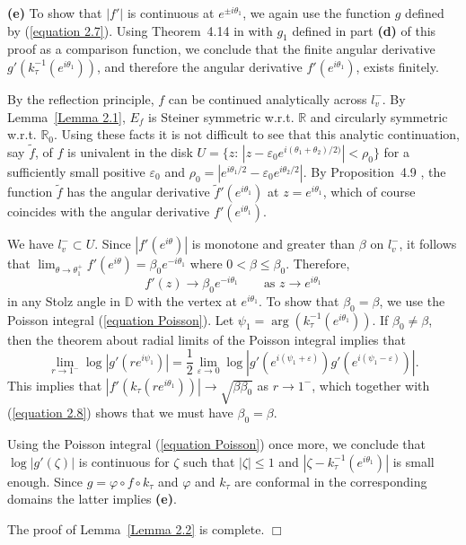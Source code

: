 \documentclass[mn,a4paper,fleqn]{w-art}
\newcommand{\be}{\begin{equation}}
\newcommand{\ee}{\end{equation}}
\begin{document}
{\textbf{(e)} To show that $|f'|$ is continuous at $e^{\pm
i\theta_1}$, we again use the function $g$ defined by
(\ref{equation 2.7}). Using Theorem~4.14 in \cite{P} with $g_1$
defined in part \textbf{(d)} of this proof as a comparison
function, we conclude that the finite angular derivative
$g'(k_\tau^{-1}(e^{i\theta_1}))$, and therefore the angular
derivative $f'(e^{i\theta_1})$, exists finitely.

By the reflection principle, $f$ can be continued analytically
across $l_v^-$. By Lemma~\ref{Lemma 2.1}, $E_f$ is Steiner
symmetric w.r.t. $\mathbb{R}$ and circularly symmetric w.r.t.
$\mathbb{R}_0$. Using these facts it is not difficult to see that
this analytic continuation, say $\tilde f$, of $f$ is univalent in
the disk
$U=\{z:\,|z-\varepsilon_0e^{i(\theta_1+\theta_2)/2)}|<\rho_0\}$
for a sufficiently small positive $\varepsilon_0$ and
$\rho_0=|e^{i\theta_1/2}-\varepsilon_0e^{i\theta_2/2}|$. By
Proposition~4.9 \cite{P}, the function $\tilde f$ has the angular
derivative ${\tilde f}'(e^{i\theta_1})$ at $z=e^{i\theta_1}$,
which of course coincides with the angular derivative
$f'(e^{i\theta_1})$.

We have $l_v^-\subset U$. Since $|f'(e^{i\theta})|$ is monotone
and greater than $\beta$ on $l_v^-$, it follows that
$\lim_{\theta\to \theta_1^+}
f'(e^{i\theta})=\beta_0e^{-i\theta_1}$ where
$0 < \beta \le \beta_0$. Therefore,  %
\be  \label{equation 2.8} %
f'(z)\to \beta_0e^{-i\theta_1} \quad \quad {\mbox{as \ \ $z\to
e^{i\theta_1}$}}  %
\ee  %
in any Stolz angle in $\mathbb{D}$ with the vertex at
$e^{i\theta_1}$. To show that $\beta_0=\beta$, we use the Poisson
integral (\ref{equation Poisson}). Let
$\psi_1=\arg(k_\tau^{-1}(e^{i\theta_1}))$. If $\beta_0\not=\beta$,
then the theorem about radial limits of the Poisson integral
implies
that %
$$  %
\lim_{r\to 1^-}\log|g'(re^{i\psi_1})|=\frac12\lim_{\varepsilon \to
0}
\log|g'(e^{i(\psi_1+\varepsilon)})g'(e^{i(\psi_1-\varepsilon)})|. %
$$  %
This implies that $|f'(k_\tau(re^{i\theta_1}))|\to
\sqrt{\beta\beta_0}$ as $r\to 1^-$, which together with
(\ref{equation 2.8}) shows that we must have $\beta_0=\beta$.

Using the Poisson integral (\ref{equation Poisson}) once more, we
conclude that $\log|g'(\zeta)|$ is continuous for $\zeta$ such
that $|\zeta|\le 1$ and $|\zeta-k_\tau^{-1}(e^{i\theta_1})|$ is
small enough. Since $g=\varphi\circ f\circ k_\tau$ and $\varphi$
and $k_\tau$ are conformal in the corresponding domains the latter
implies \textbf{(e)}.

 The proof of Lemma~\ref{Lemma 2.2} is complete. \hfill  $\Box$






}
\end{document}
